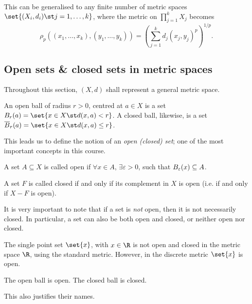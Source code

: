 This can be generalised to any finite number of metric spaces $\set{(X_i, d_i) \st j=1,\dots,k}$, where the metric on $\prod_{j=1}^{k} X_j$ becomes
\begin{equation*}
  \rho_{p}((x_1,\dots,x_k), (y_1,\dots,y_k))
  = \left(\sum_{j=1}^{k} d_{j}(x_j, y_j)^{p}\right)^{1/p}.
\end{equation*}


\subsection{Open sets \& closed sets in metric spaces}
Throughout this section, $(X,d)$ shall represent a general metric space.

\begin{ndfn}
  An open ball of radius $r>0$, centred at $a \in X$ is a set $\oB_{r}(a) = \set{x \in X \st d(x,a) < r}$. A closed ball, likewise, is a set $\cB_{r}(a) = \set{x \in X \st d(x,a) \leq r}$.
\end{ndfn}
This leads us to define the notion of an \emph{open (closed) set}; one of the most important concepts in this course.

\begin{ndfn}
  A set $A \subseteq X$ is called open if $\forall x \in A$, $\exists \varepsilon > 0$, such that $B_{\varepsilon}(x) \subseteq A$.
\end{ndfn}
\begin{ndfn}
  A set $F$ is called closed if and only if its complement in $X$ is open (i.e. if and only if $X-F$ is open).
\end{ndfn}
It is very important to note that if a set is \emph{not} open, then it is not necessarily closed. In particular, a set can also be both open and closed, or neither open nor closed.

\begin{negg}
  The single point set $\set{x}$, with $x\in\R$ is not open and closed in the metric space $\R$, using the standard metric. However, in the discrete metric $\set{x}$ is open.\eggqed
\end{negg}


\begin{nlemma}
  The open ball is open. The closed ball is closed.
\end{nlemma}
This also justifies their names.

